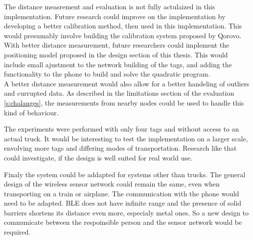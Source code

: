 The distance measrement and evaluation is not fully actulaized in this implementation.
Future research could improve on the implementation by developing a better calibration method, then used in this implementation.
This would presumably involve building the calibration system proposed by Qorovo. \\
With better distance measurement, future researchers could implement the positioning model proposed in the design section of this thesis. 
This would include small ajustment to the network building of the tags, and adding the functionality to the phone to build and solve the quadratic program.\\
A better distance measurement would also allow for a better handeling of outliers and currupted data. As described in the limitations section of the evaluation \ref{s:chalanges}, the measurements from nearby nodes could be used to handle this kind of behaviour.


The experiments were performed with only four tags and without access to an actual truck.
It would be interesting to test the implementation on a larger scale, envolving more tags and differing modes of transportation.
Research like that could investigate, if the design is well suited for real world use.

Finaly the system could be addapted for systems other than trucks.
The general design of the wireless sensor network could remain the same, even when transporting on a train or airplane.
The communication with the phone would need to be adapted.
BLE does not have infinite range and the presence of solid barriers shortens its distance even more, especialy metal ones.
So a new design to communicate between the respoinsible person and the sensor network would be required.